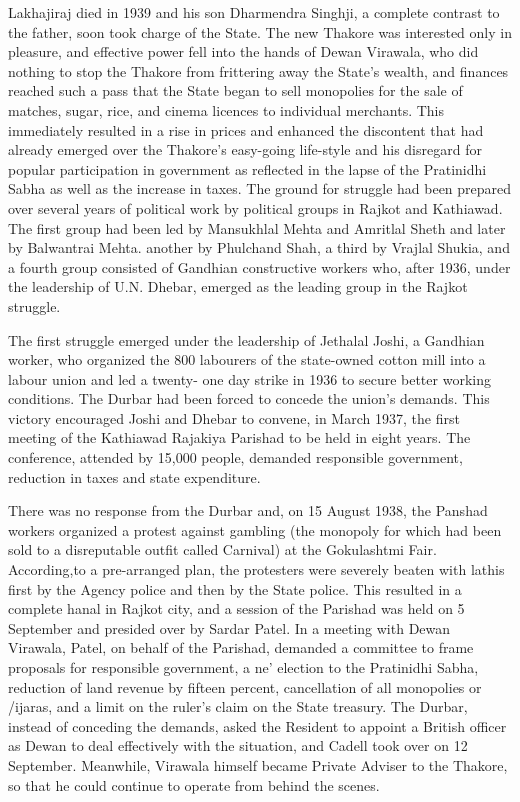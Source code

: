 Lakhajiraj died in 1939 and his son Dharmendra Singhji, a complete contrast to the father, soon took charge of the State. The new Thakore was interested only in pleasure, and effective power fell into the hands of Dewan Virawala, who did nothing to stop the Thakore from frittering away the State's wealth, and finances reached such a pass that the State began to sell monopolies for the sale of matches, sugar, rice, and cinema licences to individual merchants. This immediately resulted in a rise in prices and enhanced the discontent that had already emerged over the Thakore's easy-going life-style and his disregard for popular participation in government as reflected in the lapse of the Pratinidhi Sabha as well as the increase in taxes. The ground for struggle had been prepared over several years of political work by political groups in Rajkot and Kathiawad. The first group had been led by Mansukhlal Mehta and Amritlal Sheth and later by Balwantrai Mehta. another by Phulchand Shah, a third by Vrajlal Shukia, and a fourth group consisted of Gandhian constructive workers who, after 1936, under the leadership of U.N. Dhebar, emerged as the leading group in the Rajkot struggle. 

The first struggle emerged under the leadership of Jethalal Joshi, a Gandhian worker, who organized the 800 labourers of the state-owned cotton mill into a labour union and led a twenty- one day strike in 1936 to secure better working conditions. The Durbar had been forced to concede the union's demands. This victory encouraged Joshi and Dhebar to convene, in March 1937, the first meeting of the Kathiawad Rajakiya Parishad to be held in eight years. The conference, attended by 15,000 people, demanded responsible government, reduction in taxes and state expenditure. 

There was no response from the Durbar and, on 15 August 1938, the Panshad workers organized a protest against gambling (the monopoly for which had been sold to a disreputable outfit called Carnival) at the Gokulashtmi Fair. According,to a pre-arranged plan, the protesters were severely beaten with lathis first by the Agency police and then by the State police. This resulted in a complete hanal in Rajkot city, and a session of the Parishad was held on 5 September and presided over by Sardar Patel. In a meeting with Dewan Virawala, Patel, on behalf of the Parishad, demanded a committee to frame proposals for responsible government, a ne' election to the Pratinidhi Sabha, reduction of land revenue by fifteen percent, cancellation of all monopolies or /ijaras, and a limit on the ruler's claim on the State treasury. The Durbar, instead of conceding the demands, asked the Resident to appoint a British officer as Dewan to deal effectively with the situation, and Cadell took over on 12 September. Meanwhile, Virawala himself became Private Adviser to the Thakore, so that he could continue to operate from behind the scenes. 

